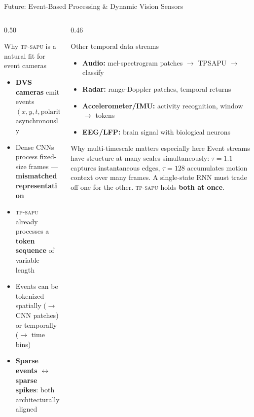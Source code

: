 \documentclass[aspectratio=169,11pt]{beamer}
\newcommand{\hl}[1]{{\color{highlight}\textbf{#1}}}
\newcommand{\tpsapu}{\textsc{tp-sapu}}
\begin{document}
\begin{frame}[shrink=10]{Future: Event-Based Processing \& Dynamic Vision Sensors}
\begin{columns}[T]
\begin{column}{0.50\textwidth}
  \begin{block}{Why \tpsapu{} is a natural fit for event cameras}
    \begin{itemize}\small
      \item \textbf{DVS cameras} emit events $(x,y,t,\text{polarity})$ asynchronously
      \item Dense CNNs process fixed-size frames — \hl{mismatched representation}
      \item \tpsapu{} already processes a \hl{token sequence} of variable length
      \item Events can be tokenized spatially ($\to$ CNN patches) or temporally ($\to$ time bins)
      \item \hl{Sparse events} $\leftrightarrow$ \hl{sparse spikes}: both architecturally aligned
    \end{itemize}
  \end{block}
  \vspace{0.3em}
\end{column}
\begin{column}{0.46\textwidth}
  \begin{alertblock}{Other temporal data streams}
    \begin{itemize}\scriptsize
      \item \textbf{Audio:} mel-spectrogram patches $\to$ TPSAPU $\to$ classify
      \item \textbf{Radar:} range-Doppler patches, temporal returns
      \item \textbf{Accelerometer/IMU:} activity recognition, window $\to$ tokens
      \item \textbf{EEG/LFP:} brain signal with biological neurons
    \end{itemize}
  \end{alertblock}
  \vspace{0.2em}
  \begin{exampleblock}{Why multi-timescale matters especially here}
    \scriptsize
    Event streams have structure at many scales simultaneously:
    $\tau{=}1.1$ captures instantaneous edges,
    $\tau{=}128$ accumulates motion context over many frames.
    A single-state RNN must trade off one for the other.
    \tpsapu{} holds \hl{both at once}.
  \end{exampleblock}
\end{column}
\end{columns}
\end{frame}
\end{document}
